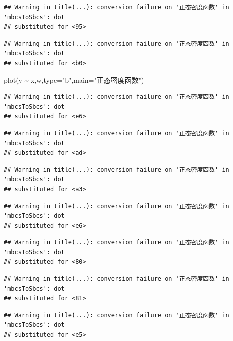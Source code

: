 \documentclass[
]{book}
\newenvironment{Shaded}{\begin{snugshade}}{\end{snugshade}}
\newcommand{\AttributeTok}[1]{\textcolor[rgb]{0.77,0.63,0.00}{#1}}
\newcommand{\FunctionTok}[1]{\textcolor[rgb]{0.00,0.00,0.00}{#1}}
\newcommand{\NormalTok}[1]{#1}
\newcommand{\SpecialCharTok}[1]{\textcolor[rgb]{0.00,0.00,0.00}{#1}}
\newcommand{\StringTok}[1]{\textcolor[rgb]{0.31,0.60,0.02}{#1}}
\begin{document}
\begin{verbatim}
## Warning in title(...): conversion failure on '正态密度函数' in 'mbcsToSbcs': dot
## substituted for <95>
\end{verbatim}

\begin{verbatim}
## Warning in title(...): conversion failure on '正态密度函数' in 'mbcsToSbcs': dot
## substituted for <b0>
\end{verbatim}

\begin{Shaded}
\begin{Highlighting}[]
\FunctionTok{plot}\NormalTok{(y }\SpecialCharTok{\textasciitilde{}}\NormalTok{ x,w,}\AttributeTok{type=}\StringTok{"b"}\NormalTok{,}\AttributeTok{main=}\StringTok{"正态密度函数"}\NormalTok{)}
\end{Highlighting}
\end{Shaded}

\begin{verbatim}
## Warning in title(...): conversion failure on '正态密度函数' in 'mbcsToSbcs': dot
## substituted for <e6>
\end{verbatim}

\begin{verbatim}
## Warning in title(...): conversion failure on '正态密度函数' in 'mbcsToSbcs': dot
## substituted for <ad>
\end{verbatim}

\begin{verbatim}
## Warning in title(...): conversion failure on '正态密度函数' in 'mbcsToSbcs': dot
## substituted for <a3>
\end{verbatim}

\begin{verbatim}
## Warning in title(...): conversion failure on '正态密度函数' in 'mbcsToSbcs': dot
## substituted for <e6>
\end{verbatim}

\begin{verbatim}
## Warning in title(...): conversion failure on '正态密度函数' in 'mbcsToSbcs': dot
## substituted for <80>
\end{verbatim}

\begin{verbatim}
## Warning in title(...): conversion failure on '正态密度函数' in 'mbcsToSbcs': dot
## substituted for <81>
\end{verbatim}

\begin{verbatim}
## Warning in title(...): conversion failure on '正态密度函数' in 'mbcsToSbcs': dot
## substituted for <e5>
\end{verbatim}
\end{document}
